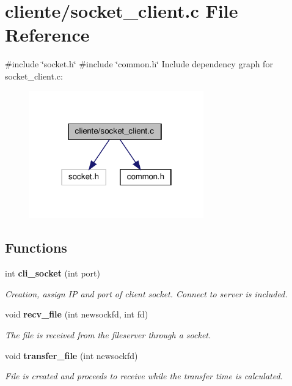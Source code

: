 \section{cliente/socket\+\_\+client.c File Reference}
\label{socket__client_8c}
{\ttfamily \#include \char`\"{}socket.\+h\char`\"{}}\newline
{\ttfamily \#include \char`\"{}common.\+h\char`\"{}}\newline
Include dependency graph for socket\+\_\+client.\+c\+:\nopagebreak
\begin{figure}[H]
\begin{center}
\leavevmode
\includegraphics[width=214pt]{socket__client_8c__incl}
\end{center}
\end{figure}
\subsection*{Functions}
\begin{DoxyCompactItemize}
\item 
int \textbf{ cli\+\_\+socket} (int port)
\begin{DoxyCompactList}\small\item\em Creation, assign IP and port of client socket. Connect to server is included. \end{DoxyCompactList}\item 
void \textbf{ recv\+\_\+file} (int newsockfd, int fd)
\begin{DoxyCompactList}\small\item\em The file is received from the fileserver through a socket. \end{DoxyCompactList}\item 
void \textbf{ transfer\+\_\+file} (int newsockfd)
\begin{DoxyCompactList}\small\item\em File is created and proceeds to receive while the transfer time is calculated. \end{DoxyCompactList}\end{DoxyCompactItemize}


